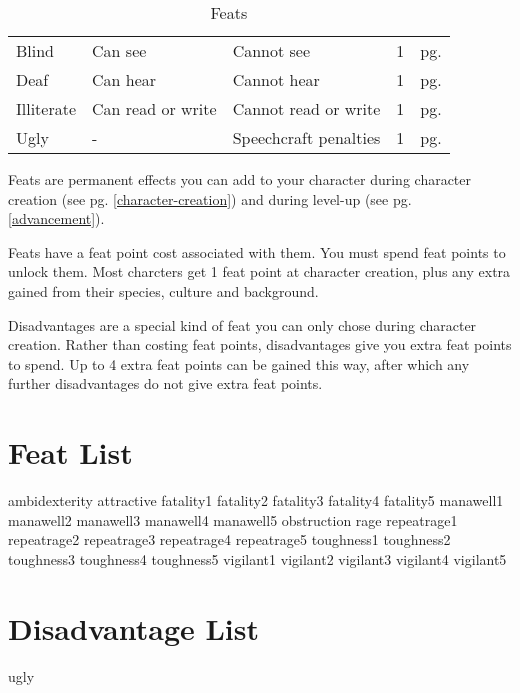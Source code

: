 \begin{multicols*}{2}
\begin{table*}[ht!]
\begin{tabularx}{\textwidth}{l X X l l}
            Blind & Can see & Cannot see & 1 & pg. \pageref{disadvantage:blind} \\
            Deaf & Can hear & Cannot hear & 1 & pg. \pageref{disadvantage:deaf} \\
            Illiterate & Can read or write & Cannot read or write & 1 & pg. \pageref{disadvantage:illiterate} \\
            Ugly & - & Speechcraft penalties & 1 & pg. \pageref{disadvantage:ugly} \\
        \end{tabularx}
        \caption{Feats}
        \label{tab:feats}
    \end{table*}

    Feats are permanent effects you can add to your character during character
    creation (see pg. \ref{character-creation}) and during level-up (see pg.
    \ref{advancement}).

    Feats have a feat point cost associated with them. You must spend feat
    points to unlock them. Most charcters get 1 feat point at character
    creation, plus any extra gained from their species, culture and background.

    Disadvantages are a special kind of feat you can only chose during
    character creation. Rather than costing feat points, disadvantages give you
    extra feat points to spend. Up to 4 extra feat points can be gained this
    way, after which any further disadvantages do not give extra feat points.

    \section{Feat List}
    {ambidexterity}
    {attractive}
    {fatality1}
    {fatality2}
    {fatality3}
    {fatality4}
    {fatality5}
    {manawell1}
    {manawell2}
    {manawell3}
    {manawell4}
    {manawell5}
    {obstruction}
    {rage}
    {repeatrage1}
    {repeatrage2}
    {repeatrage3}
    {repeatrage4}
    {repeatrage5}
    {toughness1}
    {toughness2}
    {toughness3}
    {toughness4}
    {toughness5}
    {vigilant1}
    {vigilant2}
    {vigilant3}
    {vigilant4}
    {vigilant5}

    \section{Disadvantage List}
    {ugly}

\end{multicols*}
